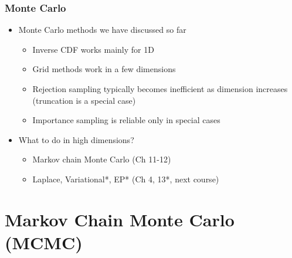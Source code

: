 \documentclass[10pt]{beamer}
\begin{document}
\begin{frame}

\frametitle{Monte Carlo}

  \begin{itemize}
  \item Monte Carlo methods we have discussed so far
    \begin{itemize}
    \item Inverse CDF works mainly for 1D \pause
    \item Grid methods work in a few dimensions \pause
    \item Rejection sampling typically becomes inefficient as dimension
      increases (truncation is a special case) \pause
    \item Importance sampling is reliable only in special cases
    \end{itemize}
    \pause
  \item What to do in high dimensions? \pause
    \begin{itemize}
    \item Markov chain Monte Carlo (Ch 11-12) \pause
    \item Laplace, Variational*, EP* (Ch 4, 13*, next course)
    \end{itemize}
  \end{itemize}
\end{frame}


\section{Markov Chain Monte Carlo (MCMC)}
\end{document}
